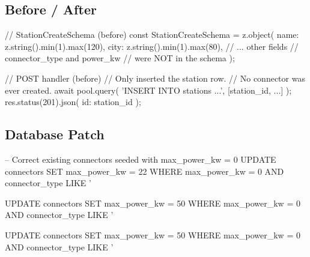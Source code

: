\documentclass[12pt,a4paper]{report}
\newcommand{\diffL}{\noindent\begin{minipage}[t]{0.485\linewidth}}
\newcommand{\diffR}{\end{minipage}\hfill\begin{minipage}[t]{0.485\linewidth}}
\newcommand{\diffend}{\end{minipage}\par\smallskip}
\begin{document}
	\subsection*{Before / After}

	\diffL
	\begin{beforecode}
// StationCreateSchema (before)
const StationCreateSchema = z.object({
  name:    z.string().min(1).max(120),
  city:    z.string().min(1).max(80),
  // ... other fields
  // connector_type and power_kw
  // were NOT in the schema
});

// POST handler (before)
// Only inserted the station row.
// No connector was ever created.
await pool.query(
  'INSERT INTO stations ...',
  [station_id, ...]
);
res.status(201).json({ id: station_id });
	\end{beforecode}
	\diffR
	\diffend

	\subsection*{Database Patch}

\begin{codebox}
-- Correct existing connectors seeded with max_power_kw = 0
UPDATE connectors SET max_power_kw = 22
  WHERE max_power_kw = 0 AND connector_type LIKE '%

UPDATE connectors SET max_power_kw = 50
  WHERE max_power_kw = 0 AND connector_type LIKE '%

UPDATE connectors SET max_power_kw = 50
  WHERE max_power_kw = 0 AND connector_type LIKE '%
\end{codebox}
\end{document}
